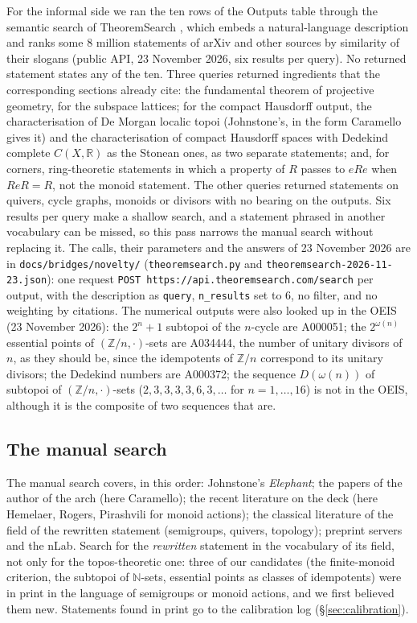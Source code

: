 For the informal side we ran the ten rows of the Outputs table through the semantic search of TheoremSearch \cite{theoremsearch}, which embeds a natural-language description and ranks some 8 million statements of arXiv and other sources by similarity of their slogans (public API, 23 November 2026, six results per query). No returned statement states any of the ten. Three queries returned ingredients that the corresponding sections already cite: the fundamental theorem of projective geometry, for the subspace lattices; for the compact Hausdorff output, the characterisation of De Morgan localic topoi (Johnstone's, in the form Caramello gives it) and the characterisation of compact Hausdorff spaces with Dedekind complete $C(X,\mathbb R)$ as the Stonean ones, as two separate statements; and, for corners, ring-theoretic statements in which a property of $R$ passes to $eRe$ when $ReR = R$, not the monoid statement. The other queries returned statements on quivers, cycle graphs, monoids or divisors with no bearing on the outputs. Six results per query make a shallow search, and a statement phrased in another vocabulary can be missed, so this pass narrows the manual search without replacing it. The calls, their parameters and the answers of 23 November 2026 are in \texttt{docs/bridges/novelty/} (\texttt{theoremsearch.py} and \texttt{theoremsearch-2026-11-23.json}): one request \texttt{POST https://api.theoremsearch.com/search} per output, with the description as \texttt{query}, \texttt{n\_results} set to 6, no filter, and no weighting by citations. The numerical outputs were also looked up in the OEIS \cite{oeis} (23 November 2026): the $2^n+1$ subtopoi of the $n$-cycle are A000051; the $2^{\omega(n)}$ essential points of $(\mathbb Z/n,\cdot)$-sets are A034444, the number of unitary divisors of $n$, as they should be, since the idempotents of $\mathbb Z/n$ correspond to its unitary divisors; the Dedekind numbers are A000372; the sequence $D(\omega(n))$ of subtopoi of $(\mathbb Z/n,\cdot)$-sets ($2, 3, 3, 3, 3, 6, 3, \dots$ for $n=1,\dots,16$) is not in the OEIS, although it is the composite of two sequences that are.

\subsection{The manual search}

The manual search covers, in this order: Johnstone's \emph{Elephant}; the papers of the author of the arch (here Caramello); the recent literature on the deck (here Hemelaer, Rogers, Pirashvili for monoid actions); the classical literature of the field of the rewritten statement (semigroups, quivers, topology); preprint servers and the nLab. Search for the \emph{rewritten} statement in the vocabulary of its field, not only for the topos-theoretic one: three of our candidates (the finite-monoid criterion, the subtopoi of $\mathbb N$-sets, essential points as classes of idempotents) were in print in the language of semigroups or monoid actions, and we first believed them new. Statements found in print go to the calibration log (\S\ref{sec:calibration}).

